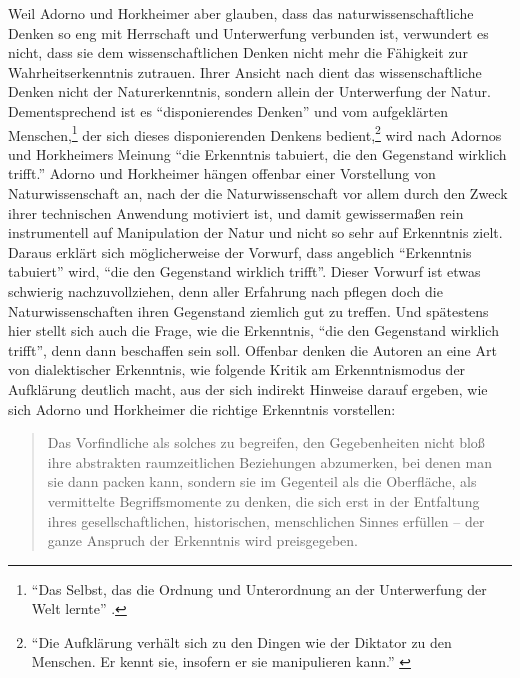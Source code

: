 \documentclass[12pt,a4paper,ngerman]{article}
\begin{document}
Weil Adorno und Horkheimer aber glauben, dass das
naturwissenschaftliche Denken so eng mit Herrschaft und Unterwerfung
verbunden ist, verwundert es nicht, dass sie dem wissenschaftlichen
Denken nicht mehr die Fähigkeit zur Wahrheitserkenntnis zutrauen.
Ihrer Ansicht nach dient das wissenschaftliche Denken nicht der
Naturerkenntnis, sondern allein der Unterwerfung der Natur.
Dementsprechend ist es "`disponierendes Denken"' \cite[S.
20]{adorno-horkheimer:1947} und vom aufgeklärten
Menschen,\footnote{"`Das Selbst, das die Ordnung und Unterordnung an
  der Unterwerfung der Welt lernte"' \cite[S.
  20]{adorno-horkheimer:1947}.} der sich dieses disponierenden Denkens
bedient,\footnote{"`Die Aufklärung verhält sich zu den Dingen wie der
  Diktator zu den Menschen. Er kennt sie, insofern er sie manipulieren
  kann."' \cite[S. 15]{adorno-horkheimer:1947}} wird nach Adornos und
Horkheimers Meinung "`die Erkenntnis tabuiert, die den Gegenstand
wirklich trifft."' \cite[S. 20]{adorno-horkheimer:1947} Adorno und
Horkheimer hängen offenbar einer Vorstellung von Naturwissenschaft an,
nach der die Naturwissenschaft vor allem durch den Zweck ihrer
technischen Anwendung motiviert ist, und damit gewissermaßen rein
instrumentell auf Manipulation der Natur und nicht so sehr auf
Erkenntnis zielt. Daraus erklärt sich möglicherweise der Vorwurf, dass
angeblich "`Erkenntnis tabuiert"' wird, "`die den Gegenstand wirklich
trifft"'. Dieser Vorwurf ist etwas schwierig nachzuvollziehen, denn
aller Erfahrung nach pflegen doch die Naturwissenschaften ihren
Gegenstand ziemlich gut zu treffen. Und spätestens hier stellt sich
auch die Frage, wie die Erkenntnis, "`die den Gegenstand wirklich
trifft"', denn dann beschaffen sein soll. Offenbar denken die Autoren
an eine Art von dialektischer Erkenntnis, wie folgende Kritik am
Erkenntnismodus der Aufklärung deutlich macht, aus der sich indirekt
Hinweise darauf ergeben, wie sich Adorno und Horkheimer die richtige
Erkenntnis vorstellen:

\begin{quotation}

Das Vorfindliche als solches zu begreifen, den Gegebenheiten nicht
bloß ihre abstrakten raumzeitlichen Beziehungen abzumerken, bei denen
man sie dann packen kann, sondern sie im Gegenteil als die Oberfläche,
als vermittelte Begriffsmomente zu denken, die sich erst in der
Entfaltung ihres gesellschaftlichen, historischen, menschlichen Sinnes
erfüllen -- der ganze Anspruch der Erkenntnis wird
preisgegeben. \cite[S. 33]{adorno-horkheimer:1947}

\end{quotation} 
\end{document}

